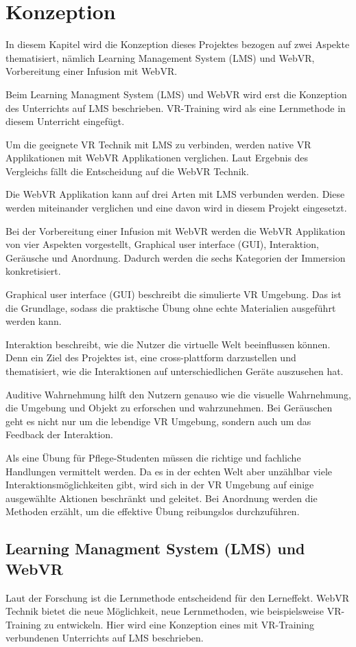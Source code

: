 \chapter{Konzeption}

In diesem Kapitel wird die Konzeption dieses Projektes bezogen auf zwei Aspekte thematisiert, nämlich Learning Management System (LMS) und WebVR, Vorbereitung einer Infusion mit WebVR.

Beim Learning Managment System (LMS) und WebVR wird erst die Konzeption des Unterrichts auf LMS beschrieben. VR-Training wird als eine Lernmethode in diesem Unterricht eingefügt.

Um die geeignete VR Technik mit LMS zu verbinden, werden native VR Applikationen mit WebVR Applikationen verglichen. Laut Ergebnis des Vergleichs fällt die Entscheidung auf die WebVR Technik.

Die WebVR Applikation kann auf drei Arten mit LMS verbunden werden. Diese werden miteinander verglichen und eine davon wird in diesem Projekt eingesetzt.

Bei der Vorbereitung einer Infusion mit WebVR werden die WebVR Applikation von vier Aspekten vorgestellt, Graphical user interface (GUI), Interaktion, Geräusche und Anordnung. Dadurch werden die sechs Kategorien der Immersion \citep{28} konkretisiert.

Graphical user interface (GUI) beschreibt die simulierte VR Umgebung. Das ist die Grundlage, sodass die praktische Übung ohne echte Materialien ausgeführt werden kann.

Interaktion beschreibt, wie die Nutzer die virtuelle Welt beeinflussen können. Denn ein Ziel des Projektes ist, eine cross-plattform darzustellen und thematisiert, wie die Interaktionen auf unterschiedlichen Geräte auszusehen hat.

Auditive Wahrnehmung hilft den Nutzern genauso wie die visuelle Wahrnehmung, die Umgebung und Objekt zu erforschen und wahrzunehmen. Bei Geräuschen geht es nicht nur um die lebendige VR Umgebung, sondern auch um das Feedback der Interaktion.

Als eine Übung für Pflege-Studenten müssen die richtige und fachliche Handlungen vermittelt werden. Da es in der echten Welt aber unzählbar viele Interaktionsmöglichkeiten gibt, wird sich in der VR Umgebung auf einige ausgewählte Aktionen beschränkt und geleitet. Bei Anordnung werden die Methoden erzählt, um die effektive Übung reibungslos durchzuführen. 

\section{Learning Managment System (LMS) und WebVR}
Laut der Forschung ist die Lernmethode entscheidend für den Lerneffekt. WebVR Technik bietet die neue Möglichkeit, neue Lernmethoden, wie beispielsweise VR-Training zu entwickeln. Hier wird eine Konzeption eines mit VR-Training verbundenen Unterrichts auf LMS beschrieben.

